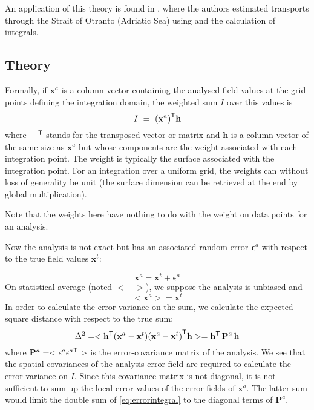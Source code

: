 An application of this theory is found in \citet{YARI12}, where the authors estimated transports through the Strait of Otranto (Adriatic Sea) using \diva and the calculation of integrals.

\subsection{Theory}

Formally, if $\mathbf{x}^a$ is a column vector containing the analysed field values at the grid
points defining the integration domain, the weighted sum $I$ over this values is
\begin{equation}
I~=~{(\mathbf{x}^a)}^\mathsf{T} \mathbf{h}
\end{equation}
where ${\quad}^\mathsf{T}$ stands for the transposed vector or matrix and $\mathbf{h}$ is a column vector of the same size as
$\mathbf{x}^a$ but whose components are the weight associated with each integration point. The weight is typically the surface associated with
the integration point. For an integration over a uniform grid, the weights can without loss of generality be unit (the surface dimension can be retrieved at the end by global multiplication). 

Note that the weights here have nothing to do with the weight on data points for an analysis.

Now the analysis is not exact but has an associated random error $\mathbf{\epsilon}^a$ with respect to the true
field values $\mathbf{x}^t$:

\begin{equation}
{\mathbf{x}^a} = \mathbf{x}^t + \mathbf{\epsilon}^a
\end{equation}
On statistical average (noted $< \quad >$), we suppose the analysis is unbiased and
\begin{equation}
<{\mathbf{x}^a}> = \mathbf{x}^t 
\end{equation}
In order to calculate the error variance on the sum, we calculate the expected square distance with respect to the true sum:
\begin{equation}
\Delta^2 = < {\mathbf{h}}^\mathsf{T}( {\mathbf{x}^a} - \mathbf{x}^t) {({\mathbf{x}^a} - \mathbf{x}^t )}^\mathsf{T} \mathbf{h} > = {\mathbf{h}}^\mathsf{T} \, \mathbf{P}^a \, \mathbf{h}
\label{eq:errorintegral}
\end{equation}
where $\mathbf{P}^a = <\mathbf{\epsilon}^a {\mathbf{\epsilon}^a}^\mathsf{T} >$ is the error-covariance matrix of the analysis.
We see that the spatial covariances of the analysis-error field are required to calculate the error variance on $I$. Since this
covariance matrix is not diagonal, it is not sufficient to sum up the local error values of the error fields of $\mathbf{x}^a$. The latter sum would limit
the double sum of \eqref{eq:errorintegral} to the diagonal terms of $\mathbf{P}^a$.


